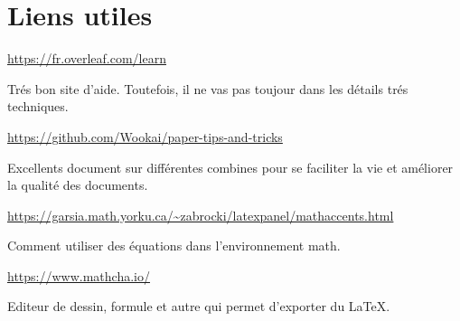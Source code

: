 \section{Liens utiles}
\url{https://fr.overleaf.com/learn}

Trés bon site d'aide.
Toutefois, il ne vas pas toujour dans les détails trés techniques.

\url{https://github.com/Wookai/paper-tips-and-tricks}

Excellents document sur différentes combines pour se faciliter la vie et améliorer la qualité des documents.

\url{https://garsia.math.yorku.ca/~zabrocki/latexpanel/mathaccents.html}

Comment utiliser des équations dans l'environnement math.

\url{https://www.mathcha.io/}

Editeur de dessin, formule et autre qui permet d'exporter du \LaTeX.